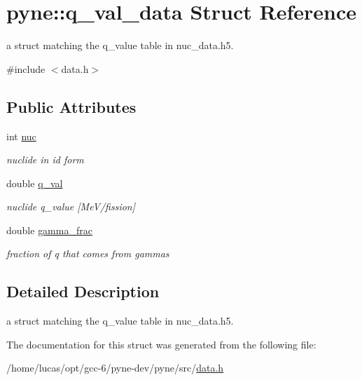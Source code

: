 \hypertarget{structpyne_1_1q__val__data}{}\section{pyne\+:\+:q\+\_\+val\+\_\+data Struct Reference}
\label{structpyne_1_1q__val__data}


a struct matching the q\+\_\+value table in nuc\+\_\+data.\+h5.  




{\ttfamily \#include $<$data.\+h$>$}

\subsection*{Public Attributes}
\begin{DoxyCompactItemize}
\item 
int \hyperlink{structpyne_1_1q__val__data_a39dbf1ad0347f0f68f09c94a9ff9157f}{nuc}\hypertarget{structpyne_1_1q__val__data_a39dbf1ad0347f0f68f09c94a9ff9157f}{}\label{structpyne_1_1q__val__data_a39dbf1ad0347f0f68f09c94a9ff9157f}

\begin{DoxyCompactList}\small\item\em nuclide in id form \end{DoxyCompactList}\item 
double \hyperlink{structpyne_1_1q__val__data_a8016ec428535fddb8cba5005511d4a8a}{q\+\_\+val}\hypertarget{structpyne_1_1q__val__data_a8016ec428535fddb8cba5005511d4a8a}{}\label{structpyne_1_1q__val__data_a8016ec428535fddb8cba5005511d4a8a}

\begin{DoxyCompactList}\small\item\em nuclide q\+\_\+value \mbox{[}Me\+V/fission\mbox{]} \end{DoxyCompactList}\item 
double \hyperlink{structpyne_1_1q__val__data_a5d47c172a924715d567a1b6119e20830}{gamma\+\_\+frac}\hypertarget{structpyne_1_1q__val__data_a5d47c172a924715d567a1b6119e20830}{}\label{structpyne_1_1q__val__data_a5d47c172a924715d567a1b6119e20830}

\begin{DoxyCompactList}\small\item\em fraction of q that comes from gammas \end{DoxyCompactList}\end{DoxyCompactItemize}


\subsection{Detailed Description}
a struct matching the q\+\_\+value table in nuc\+\_\+data.\+h5. 

The documentation for this struct was generated from the following file\+:\begin{DoxyCompactItemize}
\item 
/home/lucas/opt/gcc-\/6/pyne-\/dev/pyne/src/\hyperlink{data_8h}{data.\+h}\end{DoxyCompactItemize}
